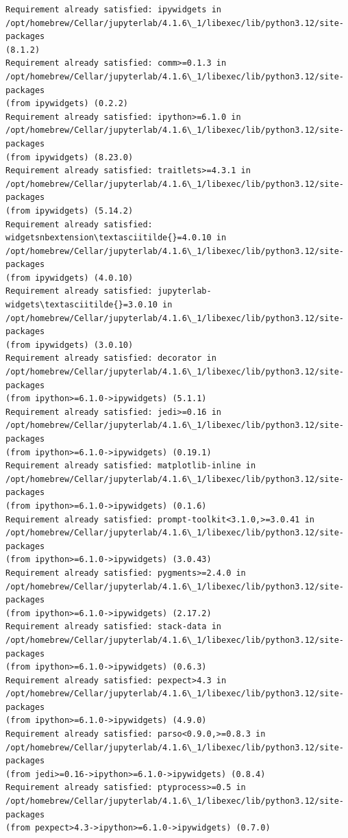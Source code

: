 \documentclass[11pt]{article}
\begin{document}
    \begin{Verbatim}[commandchars=\\\{\}]
Requirement already satisfied: ipywidgets in
/opt/homebrew/Cellar/jupyterlab/4.1.6\_1/libexec/lib/python3.12/site-packages
(8.1.2)
Requirement already satisfied: comm>=0.1.3 in
/opt/homebrew/Cellar/jupyterlab/4.1.6\_1/libexec/lib/python3.12/site-packages
(from ipywidgets) (0.2.2)
Requirement already satisfied: ipython>=6.1.0 in
/opt/homebrew/Cellar/jupyterlab/4.1.6\_1/libexec/lib/python3.12/site-packages
(from ipywidgets) (8.23.0)
Requirement already satisfied: traitlets>=4.3.1 in
/opt/homebrew/Cellar/jupyterlab/4.1.6\_1/libexec/lib/python3.12/site-packages
(from ipywidgets) (5.14.2)
Requirement already satisfied: widgetsnbextension\textasciitilde{}=4.0.10 in
/opt/homebrew/Cellar/jupyterlab/4.1.6\_1/libexec/lib/python3.12/site-packages
(from ipywidgets) (4.0.10)
Requirement already satisfied: jupyterlab-widgets\textasciitilde{}=3.0.10 in
/opt/homebrew/Cellar/jupyterlab/4.1.6\_1/libexec/lib/python3.12/site-packages
(from ipywidgets) (3.0.10)
Requirement already satisfied: decorator in
/opt/homebrew/Cellar/jupyterlab/4.1.6\_1/libexec/lib/python3.12/site-packages
(from ipython>=6.1.0->ipywidgets) (5.1.1)
Requirement already satisfied: jedi>=0.16 in
/opt/homebrew/Cellar/jupyterlab/4.1.6\_1/libexec/lib/python3.12/site-packages
(from ipython>=6.1.0->ipywidgets) (0.19.1)
Requirement already satisfied: matplotlib-inline in
/opt/homebrew/Cellar/jupyterlab/4.1.6\_1/libexec/lib/python3.12/site-packages
(from ipython>=6.1.0->ipywidgets) (0.1.6)
Requirement already satisfied: prompt-toolkit<3.1.0,>=3.0.41 in
/opt/homebrew/Cellar/jupyterlab/4.1.6\_1/libexec/lib/python3.12/site-packages
(from ipython>=6.1.0->ipywidgets) (3.0.43)
Requirement already satisfied: pygments>=2.4.0 in
/opt/homebrew/Cellar/jupyterlab/4.1.6\_1/libexec/lib/python3.12/site-packages
(from ipython>=6.1.0->ipywidgets) (2.17.2)
Requirement already satisfied: stack-data in
/opt/homebrew/Cellar/jupyterlab/4.1.6\_1/libexec/lib/python3.12/site-packages
(from ipython>=6.1.0->ipywidgets) (0.6.3)
Requirement already satisfied: pexpect>4.3 in
/opt/homebrew/Cellar/jupyterlab/4.1.6\_1/libexec/lib/python3.12/site-packages
(from ipython>=6.1.0->ipywidgets) (4.9.0)
Requirement already satisfied: parso<0.9.0,>=0.8.3 in
/opt/homebrew/Cellar/jupyterlab/4.1.6\_1/libexec/lib/python3.12/site-packages
(from jedi>=0.16->ipython>=6.1.0->ipywidgets) (0.8.4)
Requirement already satisfied: ptyprocess>=0.5 in
/opt/homebrew/Cellar/jupyterlab/4.1.6\_1/libexec/lib/python3.12/site-packages
(from pexpect>4.3->ipython>=6.1.0->ipywidgets) (0.7.0)

\end{Verbatim}
\end{document}
